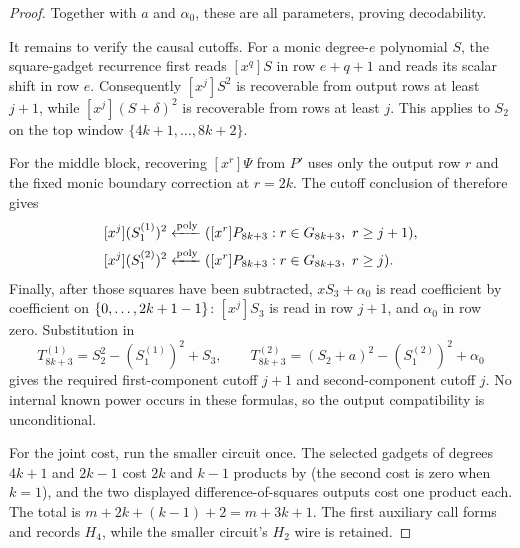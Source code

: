 \begin{proof}
    Together with $a$ and $\alpha_0$, these are all parameters, proving
    decodability.

    It remains to verify the causal cutoffs.  For a monic degree-$e$
    polynomial $S$, the square-gadget recurrence first reads $[x^q]S$ in
    row $e+q+1$ and reads its scalar shift in row $e$.  Consequently
    $[x^j]S^2$ is recoverable from output rows at least $j+1$, while
    $[x^j](S+\delta)^2$ is recoverable from rows at least $j$.  This applies
    to $S_2$ on the top window $\{4k+1,\ldots,8k+2\}$.

    For the middle block, recovering $[x^r]\Psi$ from $P'$ uses only the
    output row $r$ and the fixed monic boundary correction at $r=2k$.
    The cutoff conclusion of  therefore gives
    \[
      \begin{aligned}
      [x^j](S^{(1)}_1)^2
        &\polyfrom([x^r]P_{8k+3}:r\in G_{8k+3},\ r\ge j+1),\\
      [x^j](S^{(2)}_1)^2
        &\polyfrom([x^r]P_{8k+3}:r\in G_{8k+3},\ r\ge j).
      \end{aligned}
    \]
    Finally, after those squares have been subtracted,
    $xS_3+\alpha_0$ is read coefficient by coefficient on
    $\{0,\dotsc,2k+1-1\}$: $[x^j]S_3$ is read in row $j+1$, and $\alpha_0$ in row
    zero.  Substitution in
    \[
      T^{(1)}_{8k+3}=S_2^2-(S^{(1)}_1)^2+S_3,
      \qquad
      T^{(2)}_{8k+3}=(S_2+a)^2-(S^{(2)}_1)^2+\alpha_0
    \]
    gives the required first-component cutoff $j+1$ and second-component
    cutoff $j$.  No internal known power occurs in these formulas, so the
    output compatibility is unconditional.

    For the joint cost, run the smaller circuit once.  The selected gadgets
    of degrees $4k+1$ and $2k-1$ cost $2k$ and $k-1$ products by
     (the second cost is zero when $k=1$), and
    the two displayed difference-of-squares outputs cost one product each.
    The total is $m+2k+(k-1)+2=m+3k+1$.  The first auxiliary call forms and
    records $H_4$, while the smaller circuit's $H_2$ wire is retained.
\end{proof}
